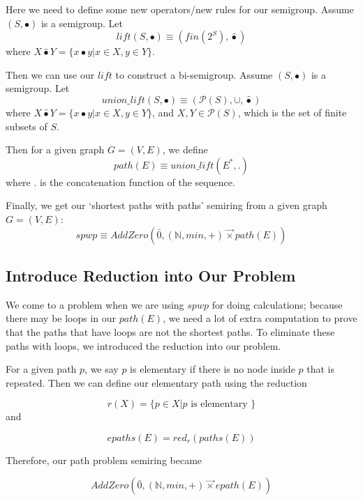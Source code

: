 \documentclass[a4paper,12pt,twoside,openright]{report}
\newcommand{\e}[2]{
\begin{equation}
  \label{#1} 
  #2
\end{equation}
}
\begin{document}
Here we need to define some new operators/new rules for our semigroup.
Assume $(S,\bullet)$ is a semigroup. Let
\begin{equation}
  \label{eq:lift:def} 
  lift(S,\bullet) \equiv (fin(2^S),\hat\bullet)
\end{equation}   
where
$X \hat\bullet Y = \{x\bullet y |x\in X,y\in Y\}$.

Then we can use our $lift$ to construct a bi-semigroup.
Assume $(S,\bullet)$ is a semigroup. Let
\begin{equation}
  \label{eq:unionlift:def} 
  union\_lift(S,\bullet)\equiv (\mathcal{P}(S),\cup,\hat\bullet)
\end{equation}  
where
$X \hat\bullet Y = \{x\bullet y |x\in X,y\in Y\}$, and $X,Y \in \mathcal{P}(S)$, which is the set of finite subsets of $S$.

Then for a given graph $G = (V,E)$, we define
\begin{equation}
  \label{eq:path:def} 
  path(E)\equiv union\_lift(E^*,.) 
\end{equation}  
where . is the concatenation function of the sequence.

Finally, we get our ‘shortest paths with paths’ semiring from a given graph $G = (V,E)$: 
\begin{equation}
  \label{eq:spwp:def} 
  spwp \equiv AddZero(\bar0,(\mathbb{N},min,+) \overrightarrow{\times} path(E))
\end{equation} 

\subsection{Introduce Reduction into Our Problem}
We come to a problem when we are using $spwp$ for doing calculations; because there may be loops in our $path(E)$, we need a lot of extra computation to prove that the paths that have loops are not the shortest paths.
To eliminate these paths with loops, we introduced the reduction into our problem.

For a given path $p$, we say $p$ is elementary if there is no node inside $p$ that is repeated. Then we can define our elementary path using the reduction 
\e{r:def:elementary}{r(X) = \{p\in X | p \mbox{ is elementary }\}}and 
\e{r:def:elementary_path}{epaths(E) = red_r(paths(E))}

Therefore, our path problem semiring became 
\e{r:def:path_problem}{AddZero(\bar0,(\mathbb{N},min,+) \overrightarrow{\times} epath(E))}
\end{document}
